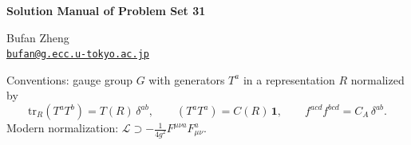\resetproblem
\begin{center}
    {\LARGE \textbf{Solution Manual of Problem Set 31} \par}
    \vspace{1em}
    {\large Bufan Zheng\\ \href{mailto:bufan@g.ecc.u-tokyo.ac.jp}{\texttt{bufan@g.ecc.u-tokyo.ac.jp}} \par}
\end{center}

\noindent Conventions: gauge group \(G\) with generators \(T^a\) in a representation \(R\) normalized by
\[
    \mathrm{tr}_R(T^aT^b)=T(R)\,\delta^{ab},\qquad
    (T^aT^a)=C(R)\,\mathbf{1},\qquad
    f^{acd}f^{bcd}=C_A\,\delta^{ab}.
\]
Modern normalization: \(\mathcal{L}\supset-\frac{1}{4g^2}F^{\mu\nu a}F_{\mu\nu}^a\).

